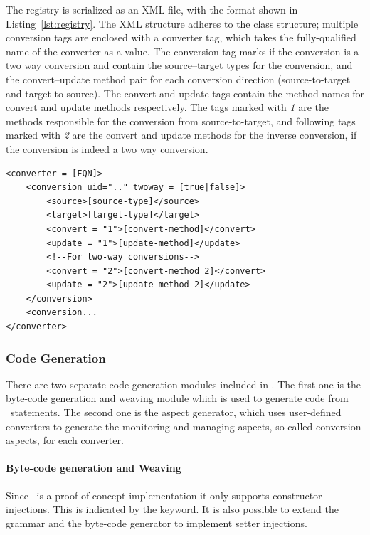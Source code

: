 The registry is serialized as an XML file, with the format shown in Listing~\ref{lst:registry}. 
The XML structure adheres to the class structure; multiple conversion tags are enclosed with a converter tag, which takes the fully-qualified name of the converter as a value. 
The conversion tag marks if the conversion is a two way conversion and contain the source--target types for the conversion, and the convert--update method pair for each conversion direction (source-to-target and target-to-source). 
The convert and update tags contain the method names for convert and update methods respectively. The tags marked with \emph{1} are the methods responsible for the conversion from source-to-target, and following tags marked with \emph{2} are the convert and update methods for the inverse conversion, if the conversion is indeed a two way conversion. 

\begin{lstlisting}[float, language=XMLRegistry, caption={The XML code for a registry item}, label={lst:registry}]
<converter = [FQN]>
	<conversion uid=".." twoway = [true|false]>
		<source>[source-type]</source>
		<target>[target-type]</target>
		<convert = "1">[convert-method]</convert>
		<update = "1">[update-method]</update>
		<!--For two-way conversions-->
		<convert = "2">[convert-method 2]</convert>
		<update = "2">[update-method 2]</update>
	</conversion>
	<conversion...
</converter>
\end{lstlisting}


\subsubsection{Code Generation}

There are two separate code generation modules included in \zamk. The first one is the byte-code generation and weaving module which is used to generate code from \gluer~statements. 
The second one is the aspect generator, which uses user-defined converters to generate the monitoring and managing aspects, so-called conversion aspects, for each converter.

\paragraph{Byte-code generation and Weaving}
Since \gluer~is a proof of concept implementation it only supports constructor injections. 
This is indicated by the  keyword. 
It is also possible to extend the grammar and the byte-code generator to implement setter injections. 

